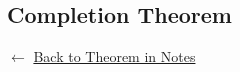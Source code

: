 
\subsection*{Completion Theorem}
\label{prf:completion}


\begin{remark*}[Return]
$\leftarrow$ \hyperref[thm:completion]{Back to Theorem in Notes}
\end{remark*}

